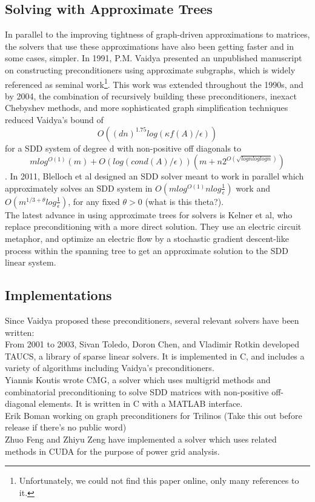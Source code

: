 \documentclass{article}
\begin{document}
\subsection*{Solving with Approximate Trees}
In parallel to the improving tightness of graph-driven approximations to matrices, the solvers that use these approximations have also been getting faster and in some cases, simpler.
In 1991, P.M. Vaidya presented an unpublished manuscript\cite{vaidya} on constructing preconditioners using approximate subgraphs, which is widely referenced as seminal work\footnote{Unfortunately, we could not find this paper online, only many references to it.}.  This work was extended throughout the 1990s, and by 2004, the combination of recursively building these preconditioners, inexact Chebyshev methods, and more sophisticated graph simplification techniques reduced Vaidya's bound of $$O((dn)^{1.75}log(κf(A)/\epsilon))$$ for a SDD system of degree d with non-positive off diagonals to $$mlog^{O(1)}(m)+O(log(cond(A)/\epsilon))(m+n2^{O(\sqrt{lognlog logn})})$$\cite{nearly-linear-sparse}.
In 2011, Blelloch et al designed an SDD solver meant to work in parallel which approximately solves an SDD system in 
$O(mlog^{O(1)}nlog\frac{1}{\epsilon})$ work and $O(m^{1/3 + \theta}log\frac{1}{\epsilon})$, for any fixed $\theta>0$ (what is this theta?).\\


The latest advance in using approximate trees for solvers is Kelner et al\cite{comb-sdd}, who replace preconditioning with a more direct solution.  They use an electric circuit metaphor, and optimize an electric flow by a stochastic gradient descent-like process within the spanning tree to get an approximate solution to the SDD linear system.  

\subsection*{Implementations}
Since Vaidya proposed these preconditioners, several relevant solvers have been written:\\
From 2001 to 2003, Sivan Toledo, Doron Chen, and Vladimir Rotkin developed TAUCS\cite{taucs}, a library of sparse linear solvers. 
It is implemented in C, and includes a variety of algorithms including Vaidya's preconditioners.\\
Yiannis Koutis wrote CMG\cite{CMG}, a solver which uses multigrid methods and combinatorial preconditioning to solve SDD matrices with non-positive off-diagonal elements.  It is written in C with a MATLAB interface.\\
Erik Boman working on graph preconditioners for Trilinos (Take this out before release if there's no public word)\\
Zhuo Feng and Zhiyu Zeng have implemented a solver which uses related methods in CUDA for the purpose of power grid analysis.\\
\end{document}
